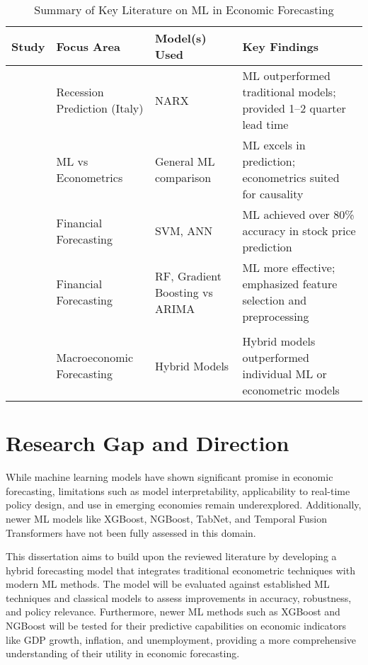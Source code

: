 \begin{table}[H]
    \centering
    \caption{Summary of Key Literature on ML in Economic Forecasting}
    \renewcommand{\arraystretch}{1.3}
    \begin{tabularx}{\textwidth}{|X|X|X|X|}
        \hline
        \textbf{Study}          & \textbf{Focus Area}          & \textbf{Model(s) Used}         & \textbf{Key Findings}                                              \\
        \hline
        \citet{HarishParuchuri} & Recession Prediction (Italy) & NARX                           & ML outperformed traditional models; provided 1–2 quarter lead time \\
        \hline
        \citet{Varian2014-ez}   & ML vs Econometrics           & General ML comparison          & ML excels in prediction; econometrics suited for causality         \\
        \hline
        \citet{Hsu2016-in}      & Financial Forecasting        & SVM, ANN                       & ML achieved over 80\% accuracy in stock price prediction           \\
        \hline
        \citet{Chernysh2024-vg} & Financial Forecasting        & RF, Gradient Boosting vs ARIMA & ML more effective; emphasized feature selection and preprocessing  \\
        \hline
        \makecell[tl]{\citeauthor{SaurabhGhosh-AbhishekRanjan},                                                                                                      \\ \citeauthor{Yusuf2025-pc}} & Macroeconomic Forecasting & Hybrid Models & Hybrid models outperformed individual ML or econometric models \\
        \hline
    \end{tabularx}
\end{table}

\section{Research Gap and Direction}
\label{sec:research-gap-and-direction}

While machine learning models have shown significant promise in economic forecasting, limitations such as model interpretability, applicability to real-time policy design, and use in emerging economies remain underexplored.
Additionally, newer ML models like XGBoost, NGBoost, TabNet, and Temporal Fusion Transformers have not been fully assessed in this domain.

This dissertation aims to build upon the reviewed literature by developing a hybrid forecasting model that integrates traditional econometric techniques with modern ML methods.
The model will be evaluated against established ML techniques and classical models to assess improvements in accuracy, robustness, and policy relevance.
Furthermore, newer ML methods such as XGBoost and NGBoost will be tested for their predictive capabilities on economic indicators like GDP growth, inflation, and unemployment, providing a more comprehensive understanding of their utility in economic forecasting.